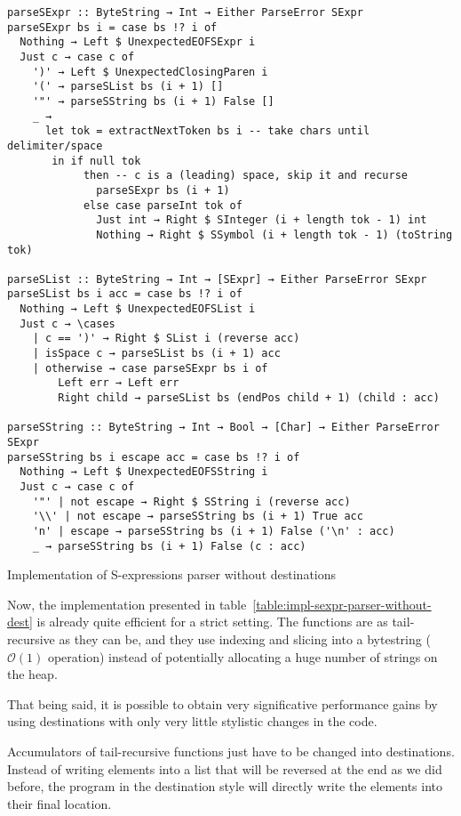 \documentclass[english]{jflart}
\begin{document}
\begin{table}[t]
\small
\begin{verbatim}
parseSExpr :: ByteString → Int → Either ParseError SExpr
parseSExpr bs i = case bs !? i of
  Nothing → Left $ UnexpectedEOFSExpr i
  Just c → case c of
    ')' → Left $ UnexpectedClosingParen i
    '(' → parseSList bs (i + 1) []
    '"' → parseSString bs (i + 1) False []
    _ →
      let tok = extractNextToken bs i -- take chars until delimiter/space
       in if null tok
            then -- c is a (leading) space, skip it and recurse
              parseSExpr bs (i + 1)
            else case parseInt tok of
              Just int → Right $ SInteger (i + length tok - 1) int
              Nothing → Right $ SSymbol (i + length tok - 1) (toString tok)

parseSList :: ByteString → Int → [SExpr] → Either ParseError SExpr
parseSList bs i acc = case bs !? i of
  Nothing → Left $ UnexpectedEOFSList i
  Just c → \cases
    | c == ')' → Right $ SList i (reverse acc)
    | isSpace c → parseSList bs (i + 1) acc
    | otherwise → case parseSExpr bs i of
        Left err → Left err
        Right child → parseSList bs (endPos child + 1) (child : acc)

parseSString :: ByteString → Int → Bool → [Char] → Either ParseError SExpr
parseSString bs i escape acc = case bs !? i of
  Nothing → Left $ UnexpectedEOFSString i
  Just c → case c of
    '"' | not escape → Right $ SString i (reverse acc)
    '\\' | not escape → parseSString bs (i + 1) True acc
    'n' | escape → parseSString bs (i + 1) False ('\n' : acc)
    _ → parseSString bs (i + 1) False (c : acc)
\end{verbatim}
\caption{Implementation of S-expressions parser without destinations}
\label{table:impl-sexpr-parser-without-dest}
\end{table}

Now, the implementation presented in table~\ref{table:impl-sexpr-parser-without-dest} is already quite efficient for a strict setting. The functions are as tail-recursive as they can be, and they use indexing and slicing into a bytestring ($\mathcal{O}(1)$ operation) instead of potentially allocating a huge number of strings on the heap.

That being said, it is possible to obtain very significative performance gains by using destinations with only very little stylistic changes in the code.

Accumulators of tail-recursive functions just have to be changed into destinations. Instead of writing elements into a list that will be reversed at the end as we did before, the program in the destination style will directly write the elements into their final location.
\end{document}
